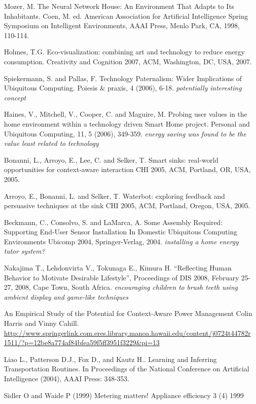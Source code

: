 Mozer, M. The Neural Network House: An Environment That Adapts to Its Inhabitants. Coen, M. ed. American Association for Artificial Intelligence Spring Symposium on Intelligent Environments, AAAI Press, Menlo Park, CA, 1998, 110-114.

Holmes, T.G. Eco-visualization: combining art and technology to reduce energy consumption. Creativity and Cognition 2007, ACM, Washington, DC, USA, 2007.

Spiekermann, S. and Pallas, F. Technology Paternalism: Wider Implications of Ubiquitous Computing. Poiesis \& praxis, 4 (2006), 6-18. \emph{potentially interesting concept}

Haines, V., Mitchell, V., Cooper, C. and Maguire, M. Probing user values in the home environment within a technology driven Smart Home project. Personal and Ubiquitous Computing, 11, 5 (2006), 349-359. \emph{energy saving was found to be the value least related to technology}

Bonanni, L., Arroyo, E., Lee, C. and Selker, T. Smart sinks: real-world opportunities for context-aware interaction CHI 2005, ACM, Portland, OR, USA, 2005.

Arroyo, E., Bonanni, L. and Selker, T. Waterbot: exploring feedback and persuasive techniques at the sink CHI 2005, ACM, Portland, Oregon, USA, 2005.

Beckmann, C., Consolvo, S. and LaMarca, A. Some Assembly Required: Supporting End-User Sensor Installation In Domestic Ubiquitous Computing Environments Ubicomp 2004, Springer-Verlag, 2004. \emph{installing a home energy tutor system?}

Nakajima T., Lehdonvirta V., Tokunaga E., Kimura H. “Reﬂecting Human Behavior to Motivate Desirable Lifestyle”, Proceedings of DIS 2008, February 25-27, 2008, Cape Town, South Africa. \emph{encouraging children to brush teeth using ambient display and game-like techniques}

An Empirical Study of the Potential for Context-Aware Power Management
Colin Harris and Vinny Cahill. \url{http://www.springerlink.com.eres.library.manoa.hawaii.edu/content/j0724t44782r1511/?p=12be8a774af84bfea59f5ff3951f3229&pi=13}

Liao L., Patterson D.J., Fox D., and Kautz H.. Learning and Inferring Transportation Routines. In Proceedings of the National Conference on Artificial Intelligence (2004), AAAI Press: 348-353.

Sidler O and Waide P (1999) Metering matters! Appliance efficiency 3 (4) 1999

